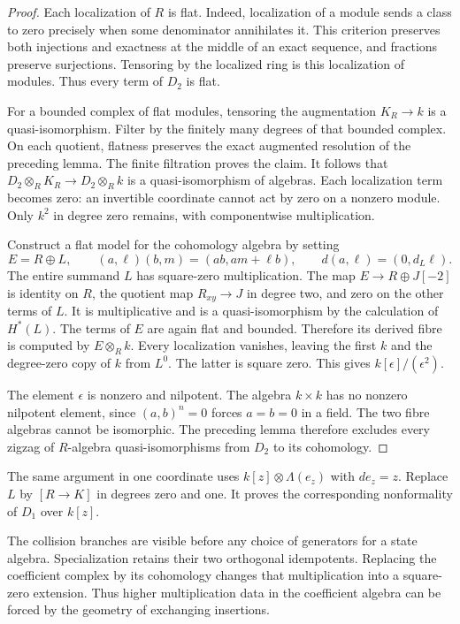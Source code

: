 \begin{proof}
Each localization of $R$ is flat.
Indeed, localization of a module sends a class to zero precisely
when some denominator annihilates it.
This criterion preserves both injections and exactness at the middle
of an exact sequence, and fractions preserve surjections.
Tensoring by the localized ring is this localization of modules.
Thus every term of $D_2$ is flat.

For a bounded complex of flat modules, tensoring the augmentation
$K_R\to k$ is a quasi-isomorphism.
Filter by the finitely many degrees of that bounded complex.
On each quotient, flatness preserves the exact augmented resolution
of the preceding lemma. The finite filtration proves the claim.
It follows that $D_2\otimes_RK_R\to D_2\otimes_Rk$ is a
quasi-isomorphism of algebras.
Each localization term becomes zero: an invertible coordinate
cannot act by zero on a nonzero module.
Only $k^2$ in degree zero remains, with componentwise multiplication.

Construct a flat model for the cohomology algebra by setting
\[
 E=R\oplus L,
 \qquad (a,\ell)(b,m)=(ab,am+\ell b),
 \qquad d(a,\ell)=(0,d_L\ell).
\]
The entire summand $L$ has square-zero multiplication.
The map $E\to R\oplus J[-2]$ is identity on $R$, the quotient
map $R_{xy}\to J$ in degree two, and zero on the other terms of $L$.
It is multiplicative and is a quasi-isomorphism by the calculation
of $H^*(L)$.
The terms of $E$ are again flat and bounded.
Therefore its derived fibre is computed by $E\otimes_Rk$.
Every localization vanishes, leaving the first $k$ and the degree-zero
copy of $k$ from $L^0$.
The latter is square zero. This gives $k[\epsilon]/(\epsilon^2)$.

The element $\epsilon$ is nonzero and nilpotent.
The algebra $k\times k$ has no nonzero nilpotent element, since
$(a,b)^n=0$ forces $a=b=0$ in a field.
The two fibre algebras cannot be isomorphic.
The preceding lemma therefore excludes every zigzag of
$R$-algebra quasi-isomorphisms from $D_2$ to its cohomology.
\end{proof}

The same argument in one coordinate uses
$k[z]\otimes\Lambda(e_z)$ with $de_z=z$.
Replace $L$ by $[R\to K]$ in degrees zero and one.
It proves the corresponding nonformality of $D_1$ over $k[z]$.

The collision branches are visible before any choice of generators
for a state algebra. Specialization retains their two orthogonal
idempotents. Replacing the coefficient complex by its cohomology
changes that multiplication into a square-zero extension.
Thus higher multiplication data in the coefficient algebra can be
forced by the geometry of exchanging insertions.

